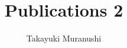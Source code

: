 \documentclass{article}
\title{Publications 2}
\author{Takayuki Muranushi}
\begin{document}
\maketitle

\nocite{*}



\end{document}
